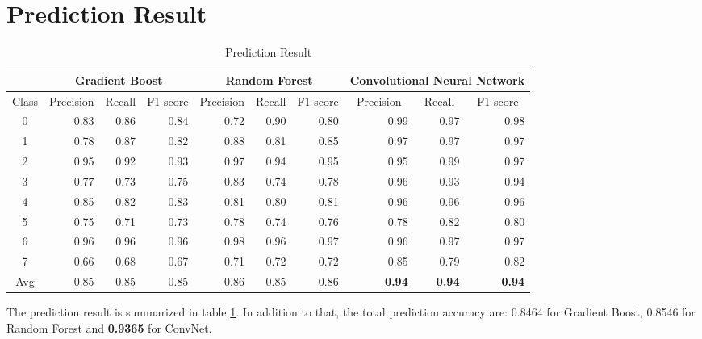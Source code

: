 \documentclass[11pt,oneside,a4paper]{article}
\numberwithin{equation}{section}
\begin{document}
\section{Prediction Result}
\begin{table}[ht]
\centering
\small
\caption{Prediction Result}
\begin{tabular}{crrrrrrrrr}
\toprule
& \multicolumn{3}{c}{Gradient Boost} & \multicolumn{3}{c}{Random Forest} & \multicolumn{3}{c}{Convolutional Neural Network}\\
\midrule
\multicolumn{1}{c}{Class} & \multicolumn{1}{c}{Precision} & \multicolumn{1}{c}{Recall} & \multicolumn{1}{c}{F1-score} & \multicolumn{1}{c}{Precision} & \multicolumn{1}{c}{Recall} & \multicolumn{1}{c}{F1-score}& \multicolumn{1}{c}{Precision} & \multicolumn{1}{c}{Recall} & \multicolumn{1}{c}{F1-score} \\
0           & 0.83      & 0.86   & 0.84     & 0.72      & 0.90   & 0.80     & 0.99      & 0.97   & 0.98     \\
1           & 0.78      & 0.87   & 0.82     & 0.88      & 0.81   & 0.85     & 0.97      & 0.97   & 0.97     \\
2           & 0.95      & 0.92   & 0.93     & 0.97      & 0.94   & 0.95     & 0.95      & 0.99   & 0.97     \\
3           & 0.77      & 0.73   & 0.75     & 0.83      & 0.74   & 0.78     & 0.96      & 0.93   & 0.94     \\
4           & 0.85      & 0.82   & 0.83     & 0.81      & 0.80   & 0.81     & 0.96      & 0.96   & 0.96     \\
5           & 0.75      & 0.71   & 0.73     & 0.78      & 0.74   & 0.76     & 0.78      & 0.82   & 0.80     \\
6           & 0.96      & 0.96   & 0.96     & 0.98      & 0.96   & 0.97     & 0.96      & 0.97   & 0.97     \\
7           & 0.66      & 0.68   & 0.67     & 0.71      & 0.72   & 0.72     & 0.85      & 0.79   & 0.82     \\
\midrule
Avg         & 0.85      & 0.85   & 0.85     & 0.86      & 0.85   & 0.86     & \textbf{0.94}      & \textbf{0.94}   & \textbf{0.94}     \\
\bottomrule
\end{tabular}
\label{tab:result}
\end{table}

The prediction result is summarized in table \ref{tab:result}. In addition to that, the total prediction accuracy are: 0.8464 for Gradient Boost, 0.8546 for Random Forest and \textbf{0.9365} for ConvNet.
\end{document}

